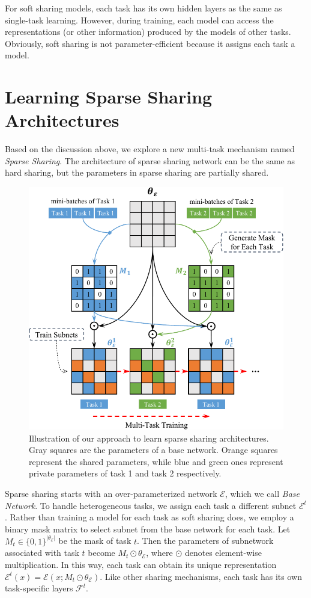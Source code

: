 \documentclass[letterpaper]{article} %
\begin{document}
For soft sharing models, each task has its own hidden layers as the same as single-task learning. However, during training, each model can access the representations (or other information) produced by the models of other tasks. Obviously, soft sharing is not parameter-efficient because it assigns each task a model.

\section{Learning Sparse Sharing Architectures}
Based on the discussion above, we explore a new multi-task mechanism named \emph{Sparse Sharing}. The architecture of sparse sharing network can be the same as hard sharing, but the parameters in sparse sharing are partially shared.

\begin{figure}[thb]
	\centering
    \includegraphics[width=\columnwidth]{3353_frame.pdf}
	\caption{Illustration of our approach to learn sparse sharing architectures. Gray squares are the parameters of a base network. Orange squares represent the shared parameters, while blue and green ones represent private parameters of task 1 and task 2 respectively. }
	\label{fig:frame}
\end{figure}

Sparse sharing starts with an over-parameterized network $\mathcal{E}$, which we call \emph{Base Network}. To handle heterogeneous tasks, we assign each task a different subnet $\mathcal{E}^t$.
Rather than training a model for each task as soft sharing does, we employ a binary mask matrix to select subnet from the base network for each task. Let $M_t\in\{0,1\}^{|\theta_\mathcal{E}|}$ be the mask of task $t$. Then the parameters of subnetwork associated with task $t$ become $M_t\odot \theta_\mathcal{E}$, where $\odot$ denotes element-wise multiplication. In this way, each task can obtain its unique representation $\mathcal{E}^t(x) = \mathcal{E}(x; M_t\odot \theta_\mathcal{E})$. Like other sharing mechanisms, each task has its own task-specific layers $\mathcal{F}^t$.
\end{document}
